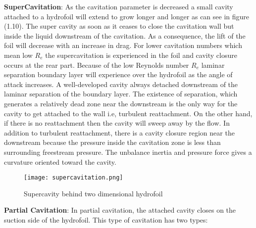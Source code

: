 \textbf{SuperCavitation}: As the cavitation parameter is decreased a
small cavity attached to a hydrofoil will extend to grow longer and
longer as can see in figure (1.10). The super cavity as soon as it ceases to close the
cavitation wall but inside the liquid downstream of the
cavitation. As a consequence, the lift of the foil will decrease with an increase in
drag. For lower cavitation numbers which mean low $R_e$
the supercavitation is experienced in the foil and cavity closure
occurs at the rear part. Because of the low Reynolds number $R_e$ laminar
separation boundary layer will experience over the hydrofoil as the angle of attack increases. 
A well-developed cavity always detached downstream of
the laminar separation of the boundary layer. The existence of separation,
which generates a relatively dead zone near the downstream is the only
way for the cavity to get attached to the wall i.e, turbulent reattachment. 
On the other hand, if there is no reattachment then the cavity will sweep away by the flow.  
In addition to turbulent reattachment, there is a  cavity closure region near the downstream
 because the pressure inside the cavitation zone is less than surrounding freestream pressure. 
The unbalance inertia and pressure force gives a
curvature oriented toward the cavity.\\

\begin{figure}[H]
 \centering
 \texttt{[image: supercavitation.png]}
 \caption{Supercavity behind two dimensional hydrofoil \cite{FundamentalsofCavitation.2004}}
  \label{fig:fig10}
\end{figure}

\textbf{Partial Cavitation}: In partial
cavitation, the attached cavity closes on the suction side of the
hydrofoil. This type of cavitation has two types:

